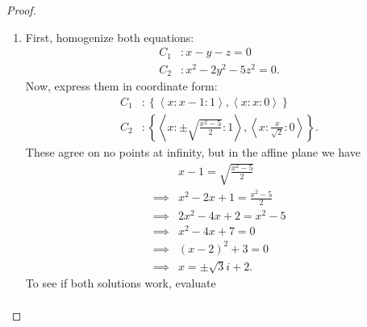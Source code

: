 \documentclass[12pt]{article}
\theoremstyle{definition}
\begin{document}
\begin{proof}
\begin{enumerate}[label=(\alph*)]
\begin{align*}
			      2x           & = -1                \\
			      x            & = -\frac{1}{2},
		      \end{align*}
		      but plugging $-\frac{1}{2}$ back into $x$, we get \begin{equation*}
			      \pm\sqrt{\left(-\frac{1}{2}\right)^2 + 2} = \pm\sqrt{\frac{9}{4}} = \pm\frac{3}{2}
		      \end{equation*}
		      and \begin{equation*}
			      -\frac{1}{2} - 1 = -\frac{3}{2},
		      \end{equation*}
		      so we get agreeement only when taking the negative square root.
		      Finally, we can characterize all points of intersection as \begin{equation*}
			      \left\lbrace \left\langle -\frac{1}{2} : -\frac{3}{2} : 1 \right\rangle, \left\langle 1 : 1 : 0 \right\rangle \right\rbrace.
		      \end{equation*}
		\item First, homogenize both equations: \begin{align*}
			      C_1 & : x - y - z = 0          \\
			      C_2 & : x^2 - 2y^2 - 5z^2 = 0.
		      \end{align*}
		      Now, express them in coordinate form: \begin{align*}
			      C_1 & : \left\lbrace \left\langle x : x - 1 : 1 \right\rangle, \left\langle x : x : 0 \right\rangle \right\rbrace                                       \\
			      C_2 & : \left\lbrace \left\langle x : \pm\sqrt{\frac{x^2-5}{2}} : 1 \right\rangle, \left\langle x : \frac{x}{\sqrt{2}} : 0 \right\rangle \right\rbrace.
		      \end{align*}
		      These agree on no points at infinity, but in the affine plane we have \begin{align*}
			               & x - 1 = \sqrt{\frac{x^2-5}{2}} \\
			      \implies & x^2 -2x + 1 = \frac{x^2-5}{2}  \\
			      \implies & 2x^2 -4x + 2 = x^2-5           \\
			      \implies & x^2 -4x + 7 = 0                \\
			      \implies & (x-2)^2 + 3 = 0                \\
			      \implies & x = \pm \sqrt{3}i + 2.
		      \end{align*}
		      To see if both solutions work, evaluate \begin{align*}

\end{align*}
\end{enumerate}
\end{proof}
\end{document}
